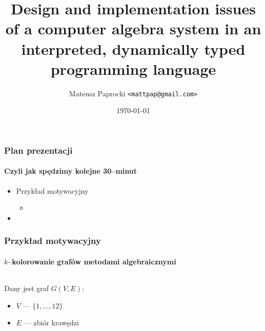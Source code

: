 \documentclass{beamer}
\title{
    Design and implementation issues \newline
    of a computer algebra system \newline
    in an interpreted, dynamically typed \newline
    programming language
}
\author{Mateusz Paprocki \texttt{<mattpap@gmail.com>}}
\institute[PWR]{Wrocław University of Technology}
\date{\today}
\begin{document}
\frame{\titlepage}

\begin{frame}
    \frametitle{Plan prezentacji}
    \framesubtitle{Czyli jak spędzimy kolejne 30--minut}

    \begin{itemize}
        \item Przykład motywacyjny
            \begin{itemize}
                \item
            \end{itemize}
        \item
    \end{itemize}
\end{frame}

\begin{frame}
    \frametitle{Przykład motywacyjny}
    \framesubtitle{$k$--kolorowanie grafów metodami algebraicznymi}

    \begin{columns}
        \begin{column}[l]{0.5\textwidth}
            Dany jest graf $G(V,E)$:
                \begin{itemize}
                    \item $V$ --- $\{ 1, \ldots, 12 \}$
                    \item $E$ --- zbiór krawędzi
                \end{itemize}
        \end{column}
        \begin{column}[r]{0.4\textwidth}
            \begin{center}
                
            \end{center}
        \end{column}
    \end{columns}
\end{frame}
\end{document}
